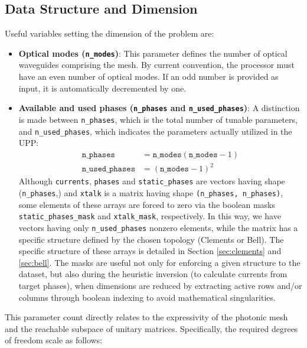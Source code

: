 \documentclass[11pt, a4paper]{article}
\begin{document}
\subsection{Data Structure and Dimension}
Useful variables setting the dimension of the problem are:
\begin{itemize}
    \item \textbf{Optical modes (\texttt{n\_modes})}: This parameter defines the number of optical waveguides comprising the mesh. By current convention, the processor must have an even number of optical modes. If an odd number is provided as input, it is automatically decremented by one.
    \item \textbf{Available and used phases (\texttt{n\_phases} and \texttt{n\_used\_phases})}: A distinction is made between \texttt{n\_phases}, which is the total number of tunable parameters, and \texttt{n\_used\_phases}, which indicates the parameters actually utilized in the UPP:
        \begin{align}
        \texttt{n\_phases} &= \texttt{n\_modes} (\texttt{n\_modes} - 1) \\
        \texttt{n\_used\_phases} &= (\texttt{n\_modes} - 1)^2
    \end{align}
    Although \texttt{currents}, \texttt{phases} and \texttt{static\_phases} are vectors having shape (\texttt{n\_phases},) and \texttt{xtalk} is a matrix having shape \texttt{(n\_phases, n\_phases)}, some elements of these arrays are forced to zero via the boolean masks \texttt{static\_phases\_mask} and \texttt{xtalk\_mask}, respectively. In this way, we have vectors having only \texttt{n\_used\_phases} nonzero elements, while the matrix has a specific structure defined by the chosen topology (Clements or Bell). The specific structure of these arrays is detailed in Section \ref{sec:clements} and \ref{sec:bell}. The masks are useful not only for enforcing a given structure to the dataset, but also during the heuristic inversion (to calculate currents from target phases), when dimensions are reduced by extracting active rows and/or columns through boolean indexing to avoid mathematical singularities.
\end{itemize}
This parameter count directly relates to the expressivity of the photonic mesh and the reachable subspace of unitary matrices. Specifically, the required degrees of freedom scale as follows:
\end{document}
